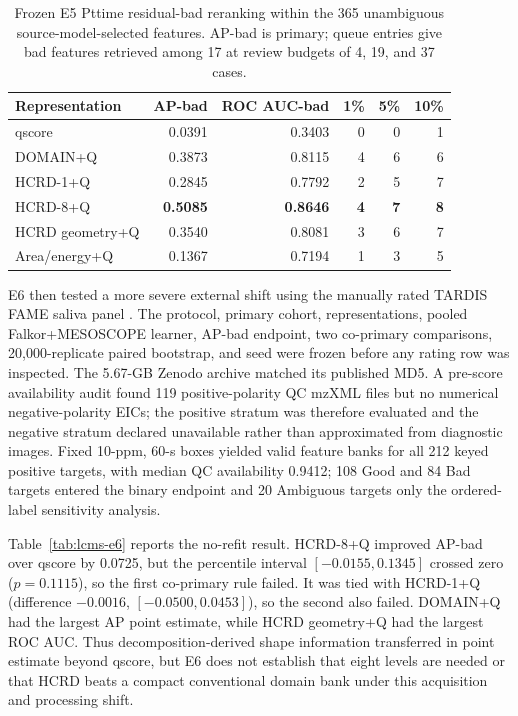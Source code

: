 \documentclass[review,onefignum,onetabnum]{siamonline250211}
\providecommand{\citep}[1]{\cite{#1}}
\begin{document}
\begin{table}[H]
\centering
\caption{Frozen E5 Pttime residual-bad reranking within the 365 unambiguous
source-model-selected features.  AP-bad is primary; queue entries give bad
features retrieved among 17 at review budgets of 4, 19, and 37 cases.}
\label{tab:lcms-e5}
\begin{tabular}{lrrrrr}
\toprule
Representation & AP-bad & ROC AUC-bad & 1\% & 5\% & 10\% \\
\midrule
qscore & 0.0391 & 0.3403 & 0 & 0 & 1 \\
DOMAIN+Q & 0.3873 & 0.8115 & 4 & 6 & 6 \\
HCRD-1+Q & 0.2845 & 0.7792 & 2 & 5 & 7 \\
HCRD-8+Q & \textbf{0.5085} & \textbf{0.8646} & \textbf{4} & \textbf{7} & \textbf{8} \\
HCRD geometry+Q & 0.3540 & 0.8081 & 3 & 6 & 7 \\
Area/energy+Q & 0.1367 & 0.7194 & 1 & 3 & 5 \\
\bottomrule
\end{tabular}
\end{table}

E6 then tested a more severe external shift using the manually rated TARDIS
FAME saliva panel \citep{vangeenderhuysen2025tardis}.  The protocol, primary
cohort, representations, pooled Falkor+MESOSCOPE learner, AP-bad endpoint, two
co-primary comparisons, 20,000-replicate paired bootstrap, and seed were frozen
before any rating row was inspected.  The 5.67-GB Zenodo archive matched its
published MD5.  A pre-score availability audit found 119 positive-polarity QC
mzXML files but no numerical negative-polarity EICs; the positive stratum was
therefore evaluated and the negative stratum declared unavailable rather than
approximated from diagnostic images.  Fixed 10-ppm, 60-s boxes yielded valid
feature banks for all 212 keyed positive targets, with median QC availability
0.9412; 108 Good and 84 Bad targets entered the binary endpoint and 20
Ambiguous targets only the ordered-label sensitivity analysis.

Table~\ref{tab:lcms-e6} reports the no-refit result.  HCRD-8+Q improved AP-bad
over qscore by 0.0725, but the percentile interval $[-0.0155,0.1345]$ crossed
zero ($p=0.1115$), so the first co-primary rule failed.  It was tied with
HCRD-1+Q (difference $-0.0016$, $[-0.0500,0.0453]$), so the second also failed.
DOMAIN+Q had the largest AP point estimate, while HCRD geometry+Q had the
largest ROC AUC.  Thus decomposition-derived shape information transferred in
point estimate beyond qscore, but E6 does not establish that eight levels are
needed or that HCRD beats a compact conventional domain bank under this
acquisition and processing shift.
\end{document}
